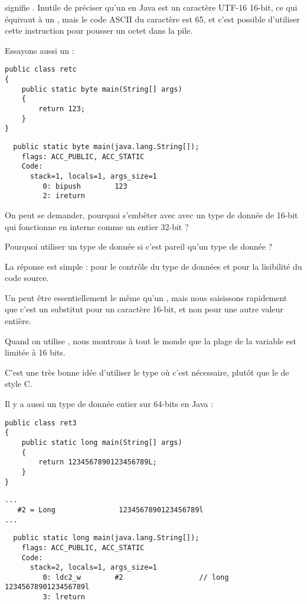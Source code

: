  signifie .
Inutile de préciser qu'un  en Java est un caractère UTF-16 16-bit, 
ce qui équivaut à un , mais le code ASCII du caractère  est 65, et c'est possible
d'utiliser cette instruction pour pousser un octet dans la pile.

Essayons aussi un :

\begin{lstlisting}[style=customjava]
public class retc
{
	public static byte main(String[] args) 
	{
		return 123;
	}
}
\end{lstlisting}

\begin{lstlisting}
  public static byte main(java.lang.String[]);
    flags: ACC_PUBLIC, ACC_STATIC
    Code:
      stack=1, locals=1, args_size=1
         0: bipush        123
         2: ireturn       
\end{lstlisting}

On peut se demander, pourquoi s'embêter avec avec un type de donnée  de 16-bit qui fonctionne en interne
comme un entier 32-bit ?

Pourquoi utiliser un type de donnée  si c'est pareil qu'un type de donnée  ?

La réponse est simple : pour le contrôle du type de données et pour la lisibilité du code source.

Un  peut être essentiellement le même qu'un , mais nous saisissons rapidement que c'est un substitut pour 
un caractère 16-bit, et non pour une autre valeur entière.

Quand on utilise , nous montrons à tout le monde que la plage de la variable est limitée à 16 bits.

C'est une très bonne idée d'utiliser le type  où c'est nécessaire, 
plutôt que le  de style C.

Il y a aussi un type de donnée entier sur 64-bits en Java :

\begin{lstlisting}[style=customjava]
public class ret3
{
	public static long main(String[] args)
	{
		return 1234567890123456789L;
	}
}
\end{lstlisting}

\begin{lstlisting}[caption=Constant pool]
...
   #2 = Long               1234567890123456789l
...
\end{lstlisting}

\begin{lstlisting}
  public static long main(java.lang.String[]);
    flags: ACC_PUBLIC, ACC_STATIC
    Code:
      stack=2, locals=1, args_size=1
         0: ldc2_w        #2                  // long 1234567890123456789l
         3: lreturn       
\end{lstlisting}

